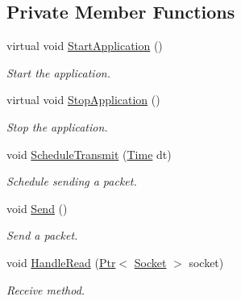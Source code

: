 \subsection*{Private Member Functions}
\begin{DoxyCompactItemize}
\item 
virtual void \hyperlink{classns3_1_1Ping6_aa7b184cb61e3c3cb32aefa4d0407f521}{Start\+Application} ()
\begin{DoxyCompactList}\small\item\em Start the application. \end{DoxyCompactList}\item 
virtual void \hyperlink{classns3_1_1Ping6_a825748c9021a08f526de4373a920861d}{Stop\+Application} ()
\begin{DoxyCompactList}\small\item\em Stop the application. \end{DoxyCompactList}\item 
void \hyperlink{classns3_1_1Ping6_af89c8bf41945f6182411ee068708bc3d}{Schedule\+Transmit} (\hyperlink{classns3_1_1Time}{Time} dt)
\begin{DoxyCompactList}\small\item\em Schedule sending a packet. \end{DoxyCompactList}\item 
void \hyperlink{classns3_1_1Ping6_a90c69934f60e7260d72f6c9fa1e6b341}{Send} ()
\begin{DoxyCompactList}\small\item\em Send a packet. \end{DoxyCompactList}\item 
void \hyperlink{classns3_1_1Ping6_a4d6c4789ad0812c345ec6b53bf4c5c63}{Handle\+Read} (\hyperlink{classns3_1_1Ptr}{Ptr}$<$ \hyperlink{classns3_1_1Socket}{Socket} $>$ socket)
\begin{DoxyCompactList}\small\item\em Receive method. \end{DoxyCompactList}\end{DoxyCompactItemize}
